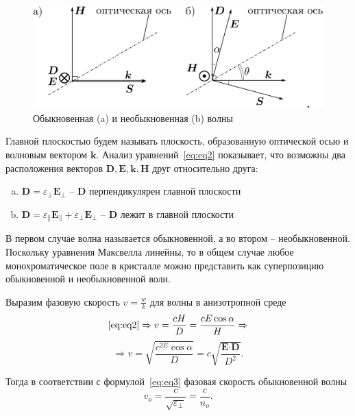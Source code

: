 \documentclass[12pt]{article}
\renewcommand{\vec}{\textbf}
\begin{document}
    \begin{figure}
        \label{fig:fig1}
        \centering
        \includegraphics[width=\linewidth]{pic/vecdiag}
        \caption{Обыкновенная (a) и необыкновенная (b) волны}
    \end{figure}
    Главной плоскостью будем называть плоскость, образованную оптической осью и волновым вектором $\vec{k}$.
    Анализ уравнений\ \eqref{eq:eq2} показывает, что возможны два расположения векторов
    $\vec{D}, \vec{E}, \vec{k}, \vec{H}$ друг относительно друга:
    \begin{enumerate}[(a)]
        \item $\vec{D} = \varepsilon_{\perp} \vec{E}_{\perp}$ -- $\vec{D}$ перпендикулярен главной плоскости
        \item $\vec{D} = \varepsilon_{\parallel} \vec{E}_{\parallel} + \varepsilon_{\perp} \vec{E}_{\perp}$ --
        $\vec{D}$ лежит в главной плоскости
    \end{enumerate}

    В первом случае волна называется обыкновенной, а во втором -- необыкновенной.
    Поскольку уравнения Максвелла линейны, то в общем случае любое монохроматическое поле в кристалле
    можно представить как суперпозицию обыкновенной и необыкновенной волн.

    Выразим фазовую скорость $v = \frac{w}{k}$ для волны в анизотропной среде
    \begin{equation*}
        \eqref{eq:eq2} \Rightarrow v = \frac{cH}{D} = \frac{cE\cos{\alpha}}{H} \Rightarrow
    \end{equation*}
    \begin{equation}
        \label{eq:eq3}
        \Rightarrow v = \sqrt{\frac{c^{2E}\cos{\alpha}}{D}} = c\sqrt{\frac{\vec{E}\cdot\vec{D}}{D^2}}.
    \end{equation}

    Тогда в соответствии с формулой\ \eqref{eq:eq3} фазовая скорость обыкновенной волны
    \begin{equation}
        \label{eq:eq4}
        v_o = \frac{c}{\sqrt{\varepsilon_{\perp}}} = \frac{c}{n_o}.
    \end{equation}
\end{document}
